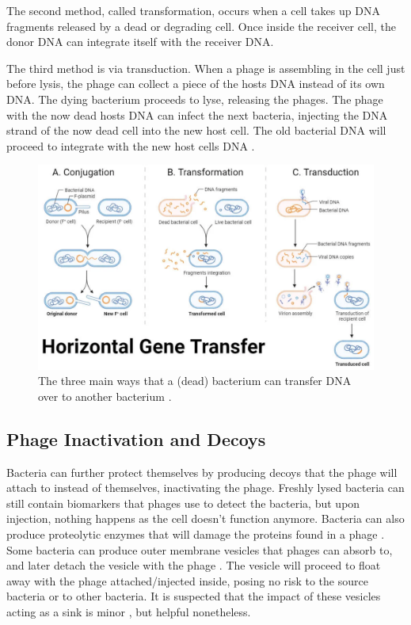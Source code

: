 The second method, called transformation, occurs when a cell takes up DNA fragments released by a dead or degrading cell. 
Once inside the receiver cell, the donor DNA can integrate itself with the receiver DNA. 

The third method is via transduction. 
When a phage is assembling in the cell just before lysis, the phage can collect a piece of the hosts DNA instead of its own DNA. 
The dying bacterium proceeds to lyse, releasing the phages. 
The phage with the now dead hosts DNA can infect the next bacteria, injecting the DNA strand of the now dead cell into the new host cell. 
The old bacterial DNA will proceed to integrate with the new host cells DNA \cite{tamangHorizontalGeneTransfer2023}. 

\begin{figure}
    \centering
    \includegraphics[width=0.7\linewidth]{Figures/horizontal_gene_transfer.png}
    \caption{The three main ways that a (dead) bacterium can transfer DNA over to another bacterium \cite{tamangHorizontalGeneTransfer2023}.}
    \label{fig:horizontal_gene_transfer}
\end{figure}

\subsection{Phage Inactivation and Decoys}
Bacteria can further protect themselves by producing decoys that the phage will attach to instead of themselves, inactivating the phage. 
Freshly lysed bacteria can still contain biomarkers that phages use to detect the bacteria, but upon injection, nothing happens as the cell doesn't function anymore. 
Bacteria can also produce proteolytic enzymes that will damage the proteins found in a phage \cite{tanQuorumSensingDetermines2015}. 
Some bacteria can produce outer membrane vesicles that phages can absorb to, and later detach the vesicle with the phage \cite{rabinovitchBacterialDebrisEcological2003}. 
The vesicle will proceed to float away with the phage attached/injected inside, posing no risk to the source bacteria or to other bacteria. 
It is suspected that the impact of these vesicles acting as a sink is minor \cite{bullPhageBacterialDynamicsSpatial2018}, but helpful nonetheless. 

